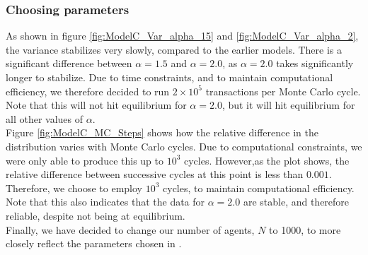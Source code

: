 \documentclass[a4paper, 10pt]{article}
\begin{document}
\subsubsection{Choosing parameters}
As shown in figure \ref{fig:ModelC_Var_alpha_15} and \ref{fig:ModelC_Var_alpha_2}, the variance stabilizes very slowly, compared to the earlier models. There is a significant difference between $\alpha=1.5$ and $\alpha=2.0$, as $\alpha=2.0$ takes significantly longer to stabilize. Due to time constraints, and to maintain computational efficiency, we therefore decided to run $2\times 10^5$ transactions per Monte Carlo cycle. Note that this will not hit equilibrium for $\alpha=2.0$, but it will hit equilibrium for all other values of $\alpha$.\\
\linebreak
Figure \ref{fig:ModelC_MC_Steps} shows how the relative difference in the distribution varies with Monte Carlo cycles. Due to computational constraints, we were only able to produce this up to $10^3$ cycles. However,as the plot shows, the relative difference between successive cycles at this point is less than $0.001$. Therefore, we choose to employ $10^3$ cycles, to maintain computational efficiency. Note that this also indicates that the data for $\alpha=2.0$ are stable, and therefore reliable, despite not being at equilibrium.\\
\linebreak
Finally, we have decided to change our number of agents, $N$ to 1000, to more closely reflect the parameters chosen in \cite{AgentBased}.
\end{document}
